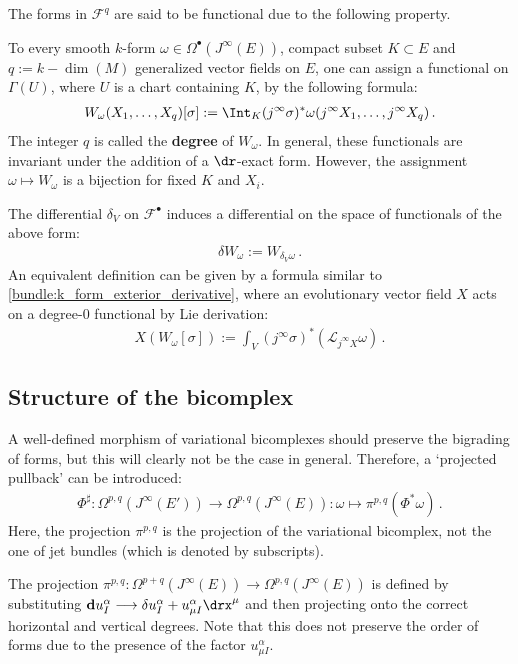     The forms in $\mathcal{F}^q$ are said to be functional due to the following property.
    \begin{property}[Functionals]\label{var:functionals}
        To every smooth $k$-form $\omega\in\Omega^\bullet(J^\infty(E))$, compact subset $K\subset E$ and $q:=k-\dim(M)$ generalized vector fields on $E$, one can assign a functional on $\Gamma(U)$, where $U$ is a chart containing $K$, by the following formula:
        \begin{gather}
            W_\omega(X_1,\ldots,X_q)[\sigma] := \Int_K(j^\infty\sigma)^*\omega(j^\infty X_1,\ldots,j^\infty X_q)\,.
        \end{gather}
        The integer $q$ is called the \textbf{degree} of $W_\omega$. In general, these functionals are invariant under the addition of a $\dr$-exact form. However, the assignment $\omega\mapsto W_\omega$ is a bijection for fixed $K$ and $X_i$.
    \end{property}
    \begin{construct}
        The differential $\delta_V$ on $\mathcal{F}^\bullet$ induces a differential on the space of functionals of the above form:
        \begin{gather}
            \delta W_\omega := W_{\delta_V\omega}\,.
        \end{gather}
        An equivalent definition can be given by a formula similar to \cref{bundle:k_form_exterior_derivative}, where an evolutionary vector field $X$ acts on a degree-$0$ functional by Lie derivation:
        \begin{gather}
            X(W_\omega[\sigma]) := \int_V(j^\infty\sigma)^*(\mathcal{L}_{j^\infty X}\omega)\,.
        \end{gather}
    \end{construct}

\subsection{Structure of the bicomplex}

    A well-defined morphism of variational bicomplexes should preserve the bigrading of forms, but this will clearly not be the case in general. Therefore, a `projected pullback' can be introduced:
    \begin{gather}
        \Phi^\sharp:\Omega^{p,q}(J^\infty(E'))\rightarrow\Omega^{p,q}(J^\infty(E)):\omega\mapsto\pi^{p,q}(\Phi^*\omega)\,.
    \end{gather}
    Here, the projection $\pi^{p,q}$ is the projection of the variational bicomplex, not the one of jet bundles (which is denoted by subscripts).
    \begin{remark}\label{var:degree_raise_remark}
        The projection $\pi^{p,q}:\Omega^{p+q}(J^\infty(E))\rightarrow\Omega^{p,q}(J^\infty(E))$ is defined by substituting $\mathbf{d}u^\alpha_I\longrightarrow\delta u^\alpha_I + u^\alpha_{\mu I}\drx^\mu$ and then projecting onto the correct horizontal and vertical degrees. Note that this does not preserve the order of forms due to the presence of the factor $u^\alpha_{\mu I}$.
    \end{remark}

